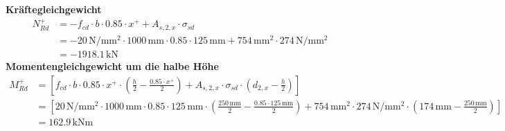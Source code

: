 \documentclass[11pt,a4paper]{article}
\begin{document}
\noindent\textbf{Kräftegleichgewicht}
\begin{equation*}
\begin{aligned}
  N_{Rd}^{+} &= -f_{cd} \cdot b \cdot 0.85 \cdot x^{+} + A_{s,2,x} \cdot \sigma_{sd} \\
  &= -20\,\mathrm{N}/\mathrm{mm}^{2} \cdot 1000\,\mathrm{mm} \cdot 0.85 \cdot 125\,\mathrm{mm} + 754\,\mathrm{mm}^{2} \cdot 274\,\mathrm{N}/\mathrm{mm}^{2} \\
  &= -1918.1\,\mathrm{kN}
\end{aligned}
\end{equation*}
\noindent\textbf{Momentengleichgewicht um die halbe Höhe}
\begin{equation*}
\begin{aligned}
  M_{Rd}^{+} &= \left[f_{cd} \cdot b \cdot 0.85 \cdot x^{+} \cdot \left(\tfrac{h}{2} - \tfrac{0.85 \cdot x^{+}}{2}\right) + A_{s,2,x} \cdot \sigma_{sd} \cdot \left(d_{2,x} - \tfrac{h}{2}\right)\right] \\
  &= \left[20\,\mathrm{N}/\mathrm{mm}^{2} \cdot 1000\,\mathrm{mm} \cdot 0.85 \cdot 125\,\mathrm{mm} \cdot \left(\tfrac{250\,\mathrm{mm}}{2} - \tfrac{0.85 \cdot 125\,\mathrm{mm}}{2}\right) + 754\,\mathrm{mm}^{2} \cdot 274\,\mathrm{N}/\mathrm{mm}^{2} \cdot \left(174\,\mathrm{mm} - \tfrac{250\,\mathrm{mm}}{2}\right)\right] \\
  &= 162.9\,\mathrm{kNm}
\end{aligned}
\end{equation*}
\end{document}
